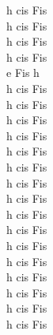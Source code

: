 \documentclass[a5paper, 10pt]{book}
\begin{document}
\begin{minipage}[t]{0.2\textwidth}
h cis Fis\\
h cis Fis\\
h cis Fis\\
h cis Fis\\

e Fis h\\

h cis Fis\\
h cis Fis\\
h cis Fis\\
h cis Fis\\

h cis Fis\\
h cis Fis\\
h cis Fis\\
h cis Fis\\

h cis Fis\\
h cis Fis\\
h cis Fis\\
h cis Fis\\

h cis Fis\\
h cis Fis\\
h cis Fis\\
h cis Fis\\

\end{minipage}

\newpage
\end{document}
